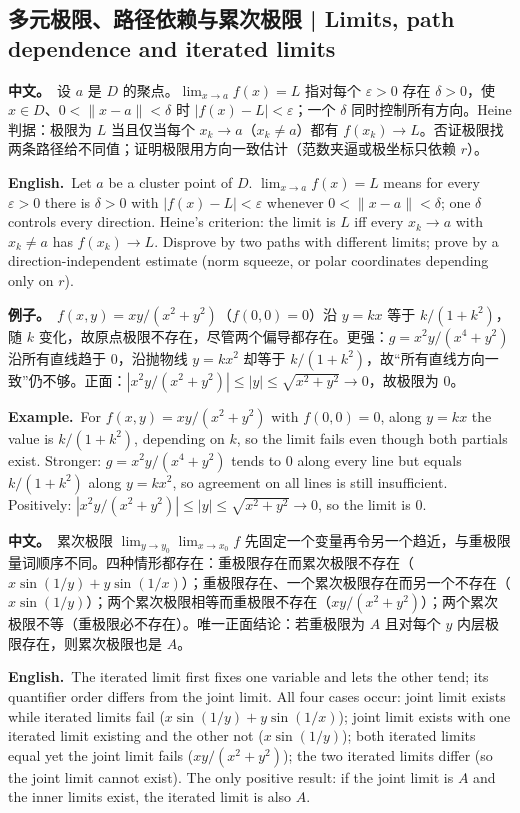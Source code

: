 \documentclass[UTF8,11pt,a4paper]{ctexart}
\newcommand{\BOTH}[2]{\par\noindent\textbf{中文。}\ #1\par\noindent\textbf{English.}\ #2\par}
\newcommand{\EX}[2]{\par\noindent\textbf{例子。}\ #1\par\noindent\textbf{Example.}\ #2\par}
\begin{document}
\subsection{多元极限、路径依赖与累次极限 | Limits, path dependence and iterated limits}
\BOTH{设 $a$ 是 $D$ 的聚点。$\lim_{x\to a}f(x)=L$ 指对每个 $\varepsilon>0$ 存在 $\delta>0$，使 $x\in D$、$0<\|x-a\|<\delta$ 时 $|f(x)-L|<\varepsilon$；一个 $\delta$ 同时控制所有方向。Heine 判据：极限为 $L$ 当且仅当每个 $x_k\to a$（$x_k\ne a$）都有 $f(x_k)\to L$。否证极限找两条路径给不同值；证明极限用方向一致估计（范数夹逼或极坐标只依赖 $r$）。}{Let $a$ be a cluster point of $D$. $\lim_{x\to a}f(x)=L$ means for every $\varepsilon>0$ there is $\delta>0$ with $|f(x)-L|<\varepsilon$ whenever $0<\|x-a\|<\delta$; one $\delta$ controls every direction. Heine's criterion: the limit is $L$ iff every $x_k\to a$ with $x_k\ne a$ has $f(x_k)\to L$. Disprove by two paths with different limits; prove by a direction-independent estimate (norm squeeze, or polar coordinates depending only on $r$).}
\EX{$f(x,y)=xy/(x^2+y^2)$（$f(0,0)=0$）沿 $y=kx$ 等于 $k/(1+k^2)$，随 $k$ 变化，故原点极限不存在，尽管两个偏导都存在。更强：$g=x^2y/(x^4+y^2)$ 沿所有直线趋于 $0$，沿抛物线 $y=kx^2$ 却等于 $k/(1+k^2)$，故“所有直线方向一致”仍不够。正面：$|x^2y/(x^2+y^2)|\le|y|\le\sqrt{x^2+y^2}\to0$，故极限为 $0$。}{For $f(x,y)=xy/(x^2+y^2)$ with $f(0,0)=0$, along $y=kx$ the value is $k/(1+k^2)$, depending on $k$, so the limit fails even though both partials exist. Stronger: $g=x^2y/(x^4+y^2)$ tends to $0$ along every line but equals $k/(1+k^2)$ along $y=kx^2$, so agreement on all lines is still insufficient. Positively: $|x^2y/(x^2+y^2)|\le|y|\le\sqrt{x^2+y^2}\to0$, so the limit is $0$.}
\BOTH{累次极限 $\lim_{y\to y_0}\lim_{x\to x_0}f$ 先固定一个变量再令另一个趋近，与重极限量词顺序不同。四种情形都存在：重极限存在而累次极限不存在（$x\sin(1/y)+y\sin(1/x)$）；重极限存在、一个累次极限存在而另一个不存在（$x\sin(1/y)$）；两个累次极限相等而重极限不存在（$xy/(x^2+y^2)$）；两个累次极限不等（重极限必不存在）。唯一正面结论：若重极限为 $A$ 且对每个 $y$ 内层极限存在，则累次极限也是 $A$。}{The iterated limit first fixes one variable and lets the other tend; its quantifier order differs from the joint limit. All four cases occur: joint limit exists while iterated limits fail ($x\sin(1/y)+y\sin(1/x)$); joint limit exists with one iterated limit existing and the other not ($x\sin(1/y)$); both iterated limits equal yet the joint limit fails ($xy/(x^2+y^2)$); the two iterated limits differ (so the joint limit cannot exist). The only positive result: if the joint limit is $A$ and the inner limits exist, the iterated limit is also $A$.}
\end{document}
